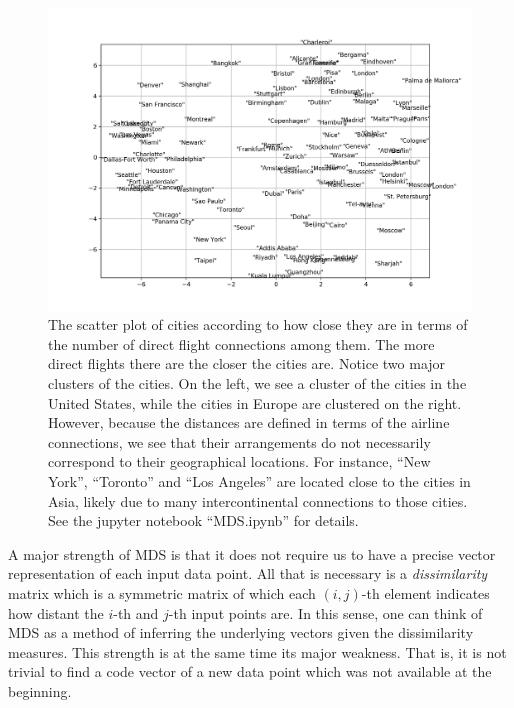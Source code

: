 \documentclass{report}
\begin{document}
\begin{figure}[t]
    \centering
    \includegraphics[width=\columnwidth]{figures/mds_cities.png}

    \caption{
        \label{fig:mds_cities}
        The scatter plot of cities according to how close they are in terms
        of the number of direct flight connections among them. The more
        direct flights there are the closer the cities are. Notice two major
        clusters of the cities. On the left, we see a cluster of the cities in
        the United States, while the cities in Europe are clustered on the
        right. However, because the distances are defined in terms of the
        airline connections, we see that their arrangements do not necessarily
        correspond to their geographical locations. For instance, ``New York'',
        ``Toronto'' and ``Los Angeles'' are located close to the cities in Asia,
        likely due to many intercontinental connections to those cities. 
        See the jupyter
        notebook ``MDS.ipynb'' for details.
    }
\end{figure}

A major strength of MDS is that it does not require us to have a precise vector
representation of each input data point. All that is necessary is a {\it
dissimilarity} matrix which is a symmetric matrix of which each $(i,j)$-th
element indicates how distant the $i$-th and $j$-th input points are. In this
sense, one can think of MDS as a method of inferring the underlying vectors
given the dissimilarity measures. This strength is at the same time its major
weakness. That is, it is not trivial to find a code vector of a new data point
which was not available at the beginning.  
\end{document}
